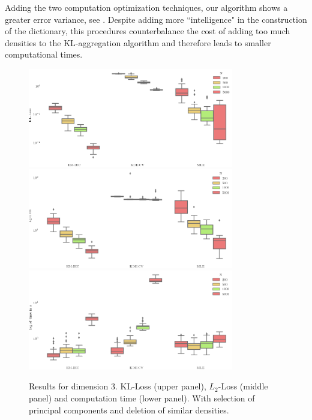 Adding the two computation optimization techniques, our algorithm shows a greater error variance, see  . Despite adding more  ``intelligence" in the construction of the dictionary, this procedures counterbalance the cost of adding too much densities to the KL-aggregation algorithm and therefore leads to smaller computational times. 
\begin{figure}
\center
    \includegraphics[width=0.8\textwidth]{./TeX_files/dict_gen_loss_dim_3_KL_gof_pc_select.png} 
    \includegraphics[width=0.8\textwidth]{./TeX_files/dict_gen_loss_dim_3_L2_gof_pc_select.png}
    \includegraphics[width=0.8\textwidth]{./TeX_files/dict_gen_time_dim_3_gof_pc_select.png}
    \caption{Results for dimension 3. KL-Loss (upper panel), $L_2$-Loss (middle panel) and computation time (lower panel). With selection of principal components and deletion of similar densities.}
    \label{fig:result_dict_gen_dim_3_gof_pc_select}
\end{figure}
